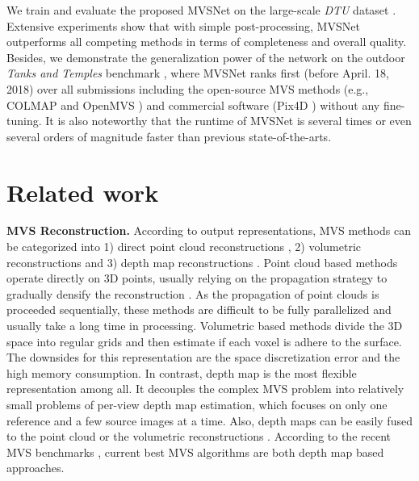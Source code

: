 \documentclass[runningheads]{llncs}
\begin{document}
We train and evaluate the proposed MVSNet on the large-scale \textit{DTU} dataset \cite{aanaes2016large}. Extensive experiments show that with simple post-processing, MVSNet outperforms all competing methods in terms of completeness and overall quality. Besides, we demonstrate the generalization power of the network on the outdoor \textit{Tanks and Temples} benchmark \cite{knapitsch2017tanks}, where MVSNet ranks first (before April. 18, 2018) over all submissions including the open-source MVS methods (e.g., COLMAP \cite{schonberger2016pixelwise} and OpenMVS \cite{openMVS}) and commercial software (Pix4D \cite{Pix4D}) without any fine-tuning. It is also noteworthy that the runtime of MVSNet is several times or even several orders of magnitude faster than previous state-of-the-arts. 






\section{Related work}

\textbf{MVS Reconstruction.}
According to output representations, MVS methods can be categorized into 1) direct point cloud reconstructions \cite{lhuillier2005quasi,furukawa2010accurate}, 2) volumetric reconstructions \cite{kutulakos2000theory,seitz1999photorealistic,ji2017surfacenet,kar2017learning} and 3) depth map reconstructions \cite{tola2012efficient,campbell2008using,galliani2015massively,schonberger2016pixelwise,yao2017relative}. 
Point cloud based methods operate directly on 3D points, usually relying on the propagation strategy to gradually densify the reconstruction \cite{lhuillier2005quasi,furukawa2010accurate}. As the propagation of point clouds is proceeded sequentially, these methods are difficult to be fully parallelized and usually take a long time in processing. 
Volumetric based methods divide the 3D space into regular grids and then estimate if each voxel is adhere to the surface. The downsides for this representation are the space discretization error and the high memory consumption. 
In contrast, depth map is the most flexible representation among all. It decouples the complex MVS problem into relatively small problems of per-view depth map estimation, which focuses on only one reference and a few source images at a time. Also, depth maps can be easily fused to the point cloud \cite{merrell2007real} or the volumetric reconstructions \cite{newcombe2011kinectfusion}. According to the recent MVS benchmarks \cite{aanaes2016large,knapitsch2017tanks}, current best MVS algorithms \cite{galliani2015massively,schonberger2016pixelwise} are both depth map based approaches. 
\end{document}
